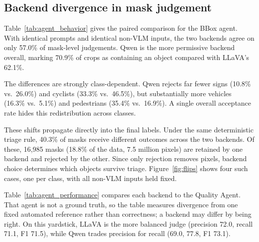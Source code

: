 \documentclass[a4paper,twoside]{article}
\begin{document}

\subsection{Backend divergence in mask judgement}

Table~\ref{tab:agent_behavior} gives the paired comparison for the BBox agent.
With identical prompts and identical non-VLM inputs, the two backends agree on only 57.0\% of mask-level judgements.
Qwen is the more permissive backend overall, marking 70.9\% of crops as containing an object compared with LLaVA’s 62.1\%.

The differences are strongly class-dependent.
Qwen rejects far fewer signs (10.8\% vs.\ 26.0\%) and cyclists (33.3\% vs.\ 46.5\%), but substantially more vehicles (16.3\% vs.\ 5.1\%) and pedestrians (35.4\% vs.\ 16.9\%).
A single overall acceptance rate hides this redistribution across classes.

These shifts propagate directly into the final labels.
Under the same deterministic triage rule, 40.3\% of masks receive different outcomes across the two backends.
Of these, 16{,}985 masks (18.8\% of the data, 7.5 million pixels) are retained by one backend and rejected by the other.
Since only rejection removes pixels, backend choice determines which objects survive triage.
Figure~\ref{fig:flips} shows four such cases, one per class, with all non-VLM inputs held fixed.

Table~\ref{tab:agent_performance} compares each backend to the Quality Agent.
That agent is not a ground truth, so the table measures divergence from one fixed automated reference rather than correctness; a backend may differ by being right.
On this yardstick, LLaVA is the more balanced judge (precision 72.0, recall 71.1, F1 71.5), while Qwen trades precision for recall (69.0, 77.8, F1 73.1).
\end{document}
